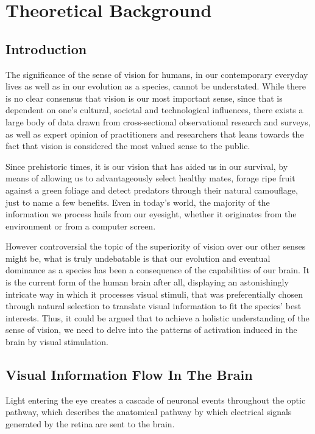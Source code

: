 \pagebreak
{}
\chapter{Theoretical Background}

\section{Introduction}

The significance of the sense of vision for humans, in our contemporary everyday lives as well as in our evolution as a species, cannot be understated. While there is no clear consensus that vision is our most important sense, since that is dependent on one's cultural, societal and technological influences, there exists a large body of data drawn from cross-sectional observational research and surveys, as well as expert opinion of practitioners and researchers that leans towards the fact that vision is considered the most valued sense to the public.

Since prehistoric times, it is our vision that has aided us in our survival, by means of allowing us to advantageously select healthy mates, forage ripe fruit against a green foliage and detect predators through their natural camouflage, just to name a few benefits. Even in today's world, the majority of the information we process hails from our eyesight, whether it originates from the environment or from a computer screen.

However controversial the topic of the superiority of vision over our other senses might be, what is truly undebatable is that our evolution and eventual dominance as a species has been a consequence of the capabilities of our brain. It is the current form of the human brain after all, displaying an astonishingly intricate way in which it processes visual stimuli, that was preferentially chosen through natural selection to translate visual information to fit the species' best interests. Thus, it could be argued that to achieve a holistic understanding of the sense of vision, we need to delve into the patterns of activation induced in the brain by visual stimulation.

\section{Visual Information Flow In The Brain}

Light entering the eye creates a cascade of neuronal events throughout the optic pathway, which describes the anatomical pathway by which electrical signals generated by the retina are sent to the brain.

